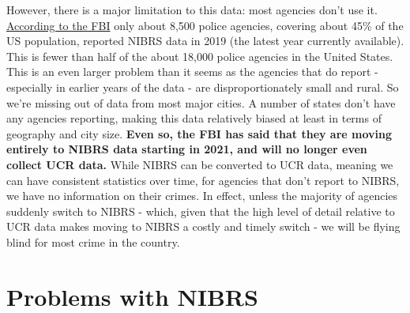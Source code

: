 \documentclass[
  12pt,
  openany]{book}
\begin{document}
However, there is a major limitation to this data: most agencies don't use it. \href{https://www.fbi.gov/news/pressrel/press-releases/fbi-releases-2019-nibrs-crime-data}{According to the FBI} only about 8,500 police agencies, covering about 45\% of the US population, reported NIBRS data in 2019 (the latest year currently available). This is fewer than half of the about 18,000 police agencies in the United States. This is an even larger problem than it seems as the agencies that do report - especially in earlier years of the data - are disproportionately small and rural. So we're missing out of data from most major cities. A number of states don't have any agencies reporting, making this data relatively biased at least in terms of geography and city size. \textbf{Even so, the FBI has said that they are moving entirely to NIBRS data starting in 2021, and will no longer even collect UCR data.} While NIBRS can be converted to UCR data, meaning we can have consistent statistics over time, for agencies that don't report to NIBRS, we have no information on their crimes. In effect, unless the majority of agencies suddenly switch to NIBRS - which, given that the high level of detail relative to UCR data makes moving to NIBRS a costly and timely switch - we will be flying blind for most crime in the country.

\hypertarget{problems-with-nibrs}{%
\section{Problems with NIBRS}\label{problems-with-nibrs}}
\end{document}
